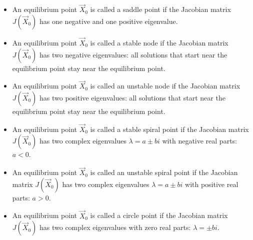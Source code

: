 \begin{paracol}{2}

\begin{itemize}
    \item An equilibrium point $\vec{X}_0$ is called a saddle point if the Jacobian matrix $J(\vec{X}_0)$ has one negative and one positive eigenvalue.

    \item An equilibrium point $\vec{X}_0$ is called a stable node if the Jacobian matrix $J(\vec{X}_0)$ has two negative eigenvalues: all solutions that start near the equilibrium point stay near the equilibrium point.

    \item An equilibrium point $\vec{X}_0$ is called an unstable node if the Jacobian matrix $J(\vec{X}_0)$ has two positive eigenvalues: all solutions that start near the equilibrium point stay near the equilibrium point.

    \item An equilibrium point $\vec{X}_0$ is called a stable spiral point if the Jacobian matrix $J(\vec{X}_0)$ has two complex eigenvalues $\lambda = a \pm bi$ with negative real parts: $a < 0$.

    \item An equilibrium point $\vec{X}_0$ is called an unstable spiral point if the Jacobian matrix $J(\vec{X}_0)$ has two complex eigenvalues $\lambda = a \pm bi$ with positive real parts: $a > 0$.

    \item An equilibrium point $\vec{X}_0$ is called a circle point if the Jacobian matrix $J(\vec{X}_0)$ has two complex eigenvalues with zero real parts:  $\lambda = \pm bi$.
\end{itemize}

\end{paracol}
